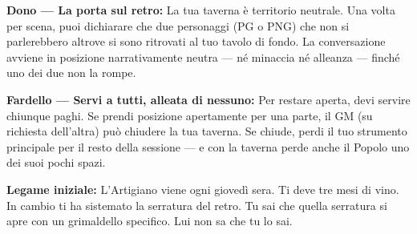 \textbf{Dono — La porta sul retro:} La tua taverna è territorio
neutrale. Una volta per scena, puoi dichiarare che due personaggi
(PG o PNG) che non si parlerebbero altrove si sono ritrovati al
tuo tavolo di fondo. La conversazione avviene in posizione
narrativamente neutra — né minaccia né alleanza — finché uno
dei due non la rompe.

\textbf{Fardello — Servi a tutti, alleata di nessuno:} Per restare
aperta, devi servire chiunque paghi. Se prendi posizione apertamente
per una parte, il GM (su richiesta dell'altra) può chiudere la
tua taverna. Se chiude, perdi il tuo strumento principale per
il resto della sessione — e con la taverna perde anche il Popolo
uno dei suoi pochi spazi.

\textbf{Legame iniziale:} L'Artigiano viene ogni giovedì sera.
Ti deve tre mesi di vino. In cambio ti ha sistemato la serratura
del retro. Tu sai che quella serratura si apre con un grimaldello
specifico. Lui non sa che tu lo sai.

\filettodoppio

